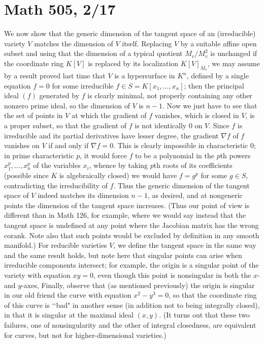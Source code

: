 \documentclass[10pt]{article}
\begin{document}
\section*{Math 505, 2/17}

We now show that the generic dimension of the tangent space of an
(irreducible) variety $V$ matches the dimension of $V$ itself. Replacing
$V$ by a suitable affine open subset and using that the dimension of a
typical quotient $M_v/M_v^2$ is unchanged if the coordinate ring $K[V]$
is replaced by its localization $K[V]_{M_v}$, we may assume by a result
proved last time that $V$ is a hypersurface in $K^n$, defined by a
single equation $f=0$ for some irreducible $f\in S=K[x_1,\ldots,x_n]$;
then the principal ideal $(f)$ generated by $f$ is clearly minimal, not
properly containing any other nonzero prime ideal, so the dimension of
$V$ is $n-1$. Now we just have to see that the set of points in $V$ at
which the gradient of $f$ vanishes, which is closed in $V$, is a proper
subset, so that the gradient of $f$ is not identically 0 on $V$. Since
$f$ is irreducible and its partial derivatives have lesser degree, the
gradient $\nabla f$ of $f$ vanishes on $V$ if and only if $\nabla f =
0$. This is clearly impossible in characteristic 0; in prime
characteristic $p$, it would force $f$ to be a polynomial in the $p$th
powers $x_1^p,\ldots,x_n^p$ of the variables $x_i$, whence by taking
$p$th roots of its coefficients (possible since $K$ is algebraically
closed) we would have $f = g^p$ for some $g\in S$, contradicting the
irreducibility of $f$. Thus the generic dimension of the tangent space
of $V$ indeed matches its dimension $n-1$, as desired, and at nongeneric
points the dimension of the tangent space increases. (Thus our point of
view is different than in Math 126, for example, where we would say
instead that the tangent space is undefined at any point where the
Jacobian matrix has the wrong corank. Note also that such points would
be excluded by definition in any smooth manifold.) For reducible
varieties $V$, we define the tangent space in the same way and the same
result holds, but note here that singular points can arise when
irreducible components intersect; for example, the origin is a singular
point of the variety with equation $xy = 0$, even though this point is
nonsingular in both the $x$- and $y$-axes, Finally, observe that (as
mentioned previously) the origin is singular in our old friend the curve
with equation $x^2 - y^3 = 0$, so that the coordinate ring of this curve
is \lq\lq bad" in another sense (in addition not to being integrally
closed), in that it is singular at the maximal ideal $(x,y)$. (It turns
out that these two failures, one of nonsingularity and the other of
integral closedness, are equivalent for curves, but not for
higher-dimensional varieties.)
\end{document}

